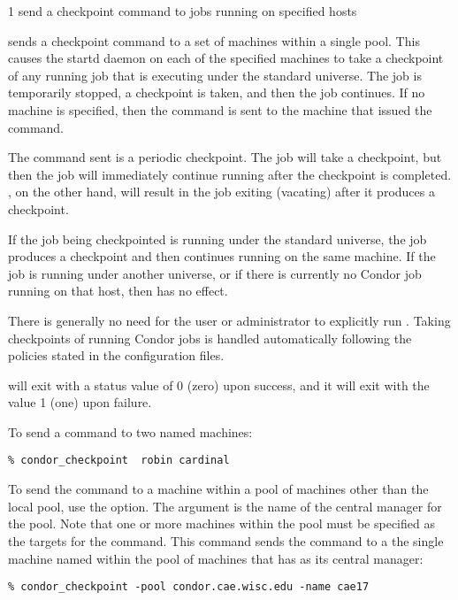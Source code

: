 \begin{ManPage}{\label{man-condor-checkpoint}}{1}
{send a checkpoint command to jobs running on specified hosts}
\Synopsis {}
\ToolArgsBase

\ToolArgsLocate

\ToolWhere


\Description
{} sends a checkpoint command to a set
of machines within a single pool.
This causes the startd daemon on each of the specified machines
to take a checkpoint of any running job that is executing under
the standard universe.
The job is temporarily stopped, a checkpoint is taken,
and then the job continues.
If no machine is specified, then the command
is sent to the machine that issued the
 command.

The command sent is a periodic checkpoint.
The job will take a checkpoint, but then the job will immediately
continue running after the checkpoint is completed.
, on the other hand, will result in the job exiting
(vacating) after it produces a checkpoint. 

If the job being checkpointed is running under the standard universe,
the job produces a checkpoint and then continues running
on the same machine.
If the job is running under another universe,
or if there is currently no Condor job
running on that host, then  has no effect. 

There is generally no need for the user or administrator to explicitly
run .
Taking checkpoints of running Condor jobs is
handled automatically following the policies
stated in the configuration files. 

\begin{Options}
	\ToolArgsBaseDesc
	\ToolArgsLocateDesc
\end{Options}

\ExitStatus

 will exit with a status value of 0 (zero) upon success,
and it will exit with the value 1 (one) upon failure.

\Examples
To send a  command to two named machines:
\begin{verbatim}
% condor_checkpoint  robin cardinal
\end{verbatim}

To send the  command to a machine
within a pool of machines other than the local pool,
use the  option.
The argument is the name of the central manager for the pool.
Note that one or more machines within the pool must be
specified as the targets for the command.
This command sends the command to
a the single machine named  within the
pool of machines that has  as
its central manager:
\begin{verbatim}
% condor_checkpoint -pool condor.cae.wisc.edu -name cae17
\end{verbatim}

\end{ManPage}
